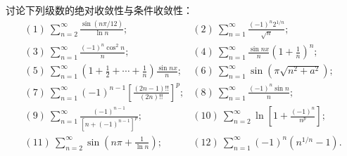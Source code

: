 \begin{xexercise}[1]
讨论下列级数的绝对收敛性与条件收敛性：
\[
\begin{array}{ll}
(1)\ \displaystyle\sum_{n=2}^{\infty}\frac{\sin(n\pi/12)}{\ln n};&
(2)\ \displaystyle\sum_{n=1}^{\infty}\frac{(-1)^n2^{1/n}}{\sqrt n};\\[6pt]
(3)\ \displaystyle\sum_{n=1}^{\infty}\frac{(-1)^n\cos^2n}{n};&
(4)\ \displaystyle\sum_{n=1}^{\infty}\frac{\sin nx}{n}\left(1+\frac1n\right)^n;\\[6pt]
(5)\ \displaystyle\sum_{n=1}^{\infty}\left(1+\frac12+\cdots+\frac1n\right)\frac{\sin nx}{n};&
(6)\ \displaystyle\sum_{n=1}^{\infty}\sin\!\left(\pi\sqrt{n^2+a^2}\right);\\[6pt]
(7)\ \displaystyle\sum_{n=1}^{\infty}(-1)^{n-1}\left[\frac{(2n-1)!!}{(2n)!!}\right]^p;&
(8)\ \displaystyle\sum_{n=1}^{\infty}\frac{(-1)^n\sin n}{n};\\[6pt]
(9)\ \displaystyle\sum_{n=1}^{\infty}\frac{(-1)^{n-1}}{[n+(-1)^{n-1}]^p};&
(10)\ \displaystyle\sum_{n=2}^{\infty}\ln\left[1+\frac{(-1)^n}{n^p}\right];\\[6pt]
(11)\ \displaystyle\sum_{n=2}^{\infty}\sin\left(n\pi+\frac1{\ln n}\right);&
(12)\ \displaystyle\sum_{n=1}^{\infty}(-1)^n(n^{1/n}-1).
\end{array}
\]
\end{xexercise}
